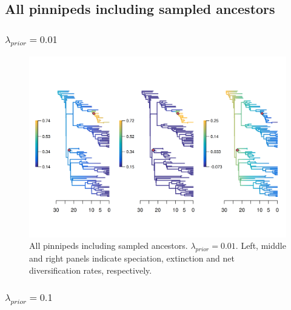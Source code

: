 \documentclass[a4paper, 12pt]{article}
\begin{document}
\subsection{All pinnipeds including sampled ancestors}

\subsubsection{$\lambda_{prior} = 0.01$}

\begin{figure}[H]
  \centering
  \includegraphics[width = \linewidth]{figures/diversification/sensitivity-analyses-with-sampled-ancestors/shifts-0-01/sensitivity-analysis-with-sampled-ancestors-0-01.png}
  \caption{All pinnipeds including sampled ancestors. $\lambda_{prior} = 0.01$. Left, middle and right panels indicate speciation, extinction and net diversification rates, respectively.}
  \label{fig-full-0-01}
\end{figure}

\subsubsection{$\lambda_{prior} = 0.1$}
\end{document}

